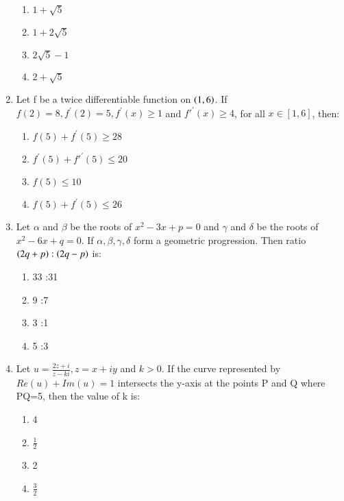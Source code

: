 \documentclass[journal,12pt,twocolumn]{IEEEtran}
\theoremstyle{remark}
\begin{document}
\begin{enumerate}
\begin{multicols}{2}
\begin{enumerate}
    \item $1+\sqrt{5}$
    \item $1+2\sqrt{5}$
    \item $2\sqrt{5}-1$
    \item $2+\sqrt{5}$
\end{enumerate}
\end{multicols}
\item Let f be a twice differentiable function on $\left(1,6\right)$. If $f(2)=8, f^\prime{}{}(2)=5, f^\prime(x)\geq1$ and $f'^\prime(x)\geq4$, for all $x\in [1,6]$, then:
\begin{multicols}{2}
\begin{enumerate}
    \item $f(5)+f^\prime(5)\geq28$
    \item $f^\prime(5)+f'^\prime(5)\leq20$
    \item $f(5)\leq10$
    \item $f(5)+f^\prime(5)\leq26$
\end{enumerate}
\end{multicols}
\item Let $\alpha$ and $\beta$ be the roots of $x^2-3x+p=0$ and $\gamma$ and $\delta$ be the roots of $x^2-6x+q=0$. If $\alpha,\beta,\gamma,\delta$ form a geometric progression. Then ratio $\left(2q+p\right):\left(2q-p\right)$ is:
\begin{multicols}{2}
\begin{enumerate}
    \item 33 :31
    \item 9 :7
    \item 3 :1
    \item 5 :3
\end{enumerate}
\end{multicols}
\item Let $u=\frac{2z+i}{z-ki},z=x+iy$ and $k>0$. If the curve represented by $Re(u)+Im(u)=1$ intersects the y-axis at the points P and Q where PQ=5, then the value of k is:
\begin{multicols}{2}
\begin{enumerate}
    \item 4
    \item $\frac{1}{2}$
    \item 2
    \item $\frac{3}{2}$
\end{enumerate}
\end{multicols}

\end{enumerate}
\end{document}
